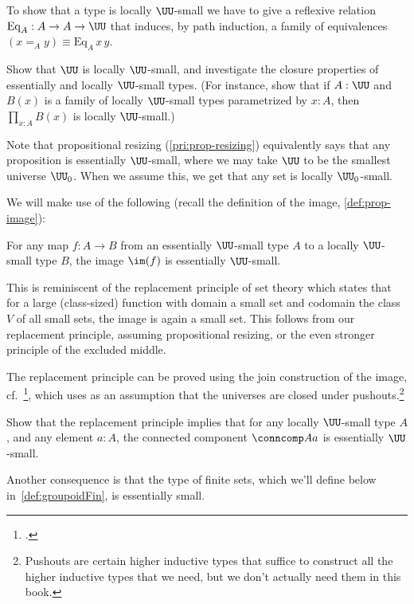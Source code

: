 To show that a type is locally $\UU$-small
we have to give a reflexive relation
$\mathrm{Eq}_A : A \to A \to \UU$
that induces, by path induction, a family of equivalences
$(x=_Ay) \equiv \mathrm{Eq}_A\,x\,y$.

\begin{xca}
  Show that $\UU$ is locally $\UU$-small, and investigate
  the closure properties of essentially and locally $\UU$-small types.
  (For instance, show that if $A:\UU$ and $B(x)$ is a family of locally $\UU$-small
  types parametrized by $x:A$, then $\prod_{x:A}B(x)$ is locally $\UU$-small.)
\end{xca}

\begin{remark}
  Note that propositional resizing (\cref{pri:prop-resizing})
  equivalently says that any proposition is essentially $\UU$-small,
  where we may take $\UU$ to be the smallest universe $\UU_0$.
  When we assume this, we get that any set is locally $\UU_0$-small.
\end{remark}

We will make use of the following (recall the definition of the image, \cref{def:prop-image}):
\begin{principle}[Replacement]
  \label{pri:replacement}
  For any map $f : A \to B$
  from an essentially $\UU$-small type $A$
  to a locally $\UU$-small type $B$,
  the image $\im(f)$ is essentially $\UU$-small.
\end{principle}
This is reminiscent of the replacement principle of set theory which states
that for a large (class-sized) function with domain a small set
and codomain the class $V$ of all small sets,
the image is again a small set.
This follows from our replacement principle,
assuming propositional resizing, or the even stronger principle of the excluded middle.

The replacement principle can be proved using the join construction of the image, cf.~\citeauthor{Rijke-Join}\footcite{Rijke-Join},
which uses as an assumption that the universes
are closed under pushouts.\footnote{%
  Pushouts are certain higher inductive types that suffice
  to construct all the higher inductive types that we need,
  but we don't actually need them in this book.}
\begin{xca}\label{xca:comp-loc-small-ess-small}
  Show that the replacement principle implies that for any locally $\UU$-small type $A$,
  and any element $a:A$,
  the connected component $\conncomp A a$ is essentially $\UU$-small.
\end{xca}
Another consequence is that the type of finite sets, which we'll define below
in~\cref{def:groupoidFin}, is essentially small.


